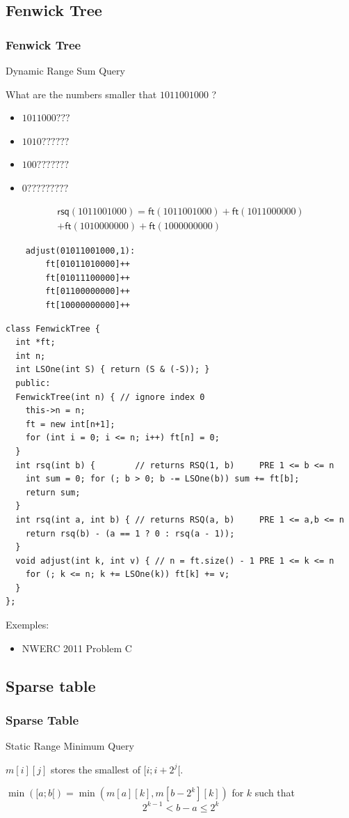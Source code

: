 \documentclass[10pt,svgnames,usenames,table]{beamer} %
\begin{document}
\subsection{Fenwick Tree}
\begin{frame}
  \frametitle{Fenwick Tree}
  Dynamic Range Sum Query

  What are the numbers smaller that $1011001000$ ?
  \begin{itemize}
    \item $1011000???$
    \item $1010??????$
    \item $100???????$
    \item $0?????????$
  \end{itemize}
  \begin{multline*}
    \mathsf{rsq}(1011001000)
    = \mathsf{ft}(1011001000)
    + \mathsf{ft}(1011000000)\\
    + \mathsf{ft}(1010000000)
    + \mathsf{ft}(1000000000)
  \end{multline*}

  \begin{lstlisting}
    adjust(01011001000,1):
        ft[01011010000]++
        ft[01011100000]++
        ft[01100000000]++
        ft[10000000000]++
  \end{lstlisting}

  \framebreak
  \begin{lstlisting}
class FenwickTree {
  int *ft;
  int n;
  int LSOne(int S) { return (S & (-S)); }
  public:
  FenwickTree(int n) { // ignore index 0
    this->n = n;
    ft = new int[n+1];
    for (int i = 0; i <= n; i++) ft[n] = 0;
  }
  int rsq(int b) {        // returns RSQ(1, b)     PRE 1 <= b <= n
    int sum = 0; for (; b > 0; b -= LSOne(b)) sum += ft[b];
    return sum;
  }
  int rsq(int a, int b) { // returns RSQ(a, b)     PRE 1 <= a,b <= n
    return rsq(b) - (a == 1 ? 0 : rsq(a - 1));
  }
  void adjust(int k, int v) { // n = ft.size() - 1 PRE 1 <= k <= n
    for (; k <= n; k += LSOne(k)) ft[k] += v;
  }
};
  \end{lstlisting}
  Exemples:
  \begin{itemize}
    \item NWERC 2011 Problem C
  \end{itemize}
\end{frame}

\subsection{Sparse table}
\begin{frame}
  \frametitle{Sparse Table}
  Static Range Minimum Query

  $m[i][j]$ stores the smallest of $[i;i+2^j[$.

  $\min([a; b[) = \min(m[a][k], m[b-2^k][k])$ for $k$ such that
  $$2^{k-1} < b-a \leq 2^k$$
\end{frame}
\end{document}
